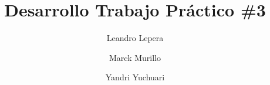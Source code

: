 \documentclass{article} %
\begin{document}
\title{Desarrollo Trabajo Práctico \#3}
\author{
    Leandro Lepera \newline
    \and
    Marck Murillo \\
    \and
    Yandri Yuchuari \\
}
\maketitle





\end{document}
